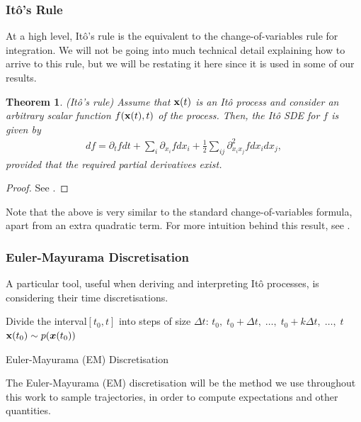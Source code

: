 \documentclass[a4paper,12pt,twoside,openright]{report}
\newtheorem{theorem}{Theorem}
\theoremstyle{definition}
\begin{document}
\subsubsection{Itô's Rule}

At a high level, Itô's rule is the equivalent to the change-of-variables rule for integration. We will not be going into much technical detail explaining how to arrive to this rule, but we will be restating it here since it is used in some of our results. 

\begin{theorem}
  (Itô's rule) Assume that ${\mathbf{x}}(t)$ is an Itô process and consider an arbitrary scalar function $f({\mathbf{x}}(t), t)$ of the process. Then, the Itô SDE for $f$ is given by
  \begin{align}\label{eq:ito_rule}
      df = \partial_t f dt + \sum_i \partial_{{x_i}} f dx_i + \frac{1}{2}\sum_{ij} \partial^2_{{x_i}{x_j}} f dx_i dx_j,
  \end{align}
  provided that the required partial derivatives exist. 
\end{theorem}
\begin{proof}
See \cite{oksendal2003stochastic}.
\end{proof}
Note that the above is very similar to the standard change-of-variables formula, apart from an extra quadratic term. For more intuition behind this result, see \citet[Chapter~4]{sarkka2019applied}.

\subsubsection{Euler-Mayurama Discretisation}

A particular tool, useful when deriving and interpreting Itô processes, is considering their time discretisations.
\begin{algorithm} \label{alg:em}
Divide the interval$[t_0, t]$ into steps of size $\Delta t$: $t_0, \;t_0 + \Delta t,\; \hdots ,\; t_0 + k \Delta t,\; \hdots, \;t$ \\
${\mathbf{x}}(t_0) \sim p({\bm{x}}(t_0))$\\
\caption{Euler-Mayurama (EM) Discretisation }
\end{algorithm}
The Euler-Mayurama (EM) discretisation will be the method we use throughout this work to sample trajectories, in order to compute expectations and other quantities.
\end{document}
